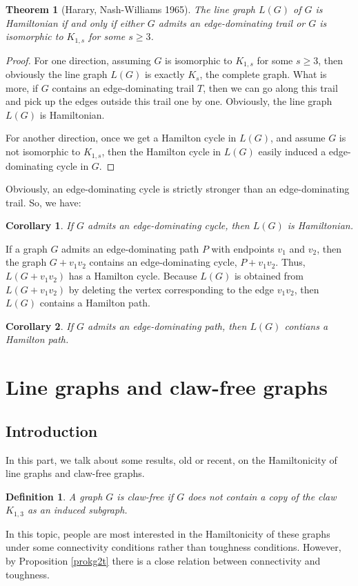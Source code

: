 \documentclass[12pt]{report}
\newtheorem{theorem}{Theorem}
\newtheorem{definition}{Definition}
\newtheorem{corollary}{Corollary}
\begin{document}
\begin{theorem}[Harary, Nash-Williams 1965]\label{edmtraitohalig}
The line graph $L(G)$ of $G$ is Hamiltonian if and only if either $G$ admits an edge-dominating trail or $G$ is isomorphic to $K_{1,s}$ for some $s\ge3$.
\end{theorem}


\begin{proof}

For one direction, assuming $G$ is isomorphic to $K_{1,s}$ for some $s\ge3$, then obviously the line graph $L(G)$ is exactly $K_s$, the complete graph. What is more, if $G$ contains an edge-dominating trail $T$, then we can go along this trail and pick up the edges outside this trail one by one. Obviously, the line graph $L(G)$ is Hamiltonian.

For another direction, once we get a Hamilton cycle in $L(G)$, and assume $G$ is not isomorphic to $K_{1,s}$, then the Hamilton cycle in $L(G)$ easily induced a edge-dominating cycle in $G$.

\end{proof}
Obviously, an edge-dominating cycle is strictly stronger than an edge-dominating trail. So, we have:
\begin{corollary}\label{edmctohlg}
If $G$ admits an edge-dominating cycle, then $L(G)$ is Hamiltonian.
\end{corollary}

If a graph $G$ admits an edge-dominating path $P$ with endpoints $v_1$ and $v_2$, then the graph $G+v_1v_2$ contains an edge-dominating cycle, $P+v_1v_2$. Thus, $L(G+v_1v_2)$ has a Hamilton cycle. Because $L(G)$ is obtained from $L(G+v_1v_2)$ by deleting the vertex corresponding to the edge $v_1v_2$, then $L(G)$ contains a Hamilton path.
\begin{corollary}
If $G$ admits an edge-dominating path, then $L(G)$ contians a Hamilton path.
\end{corollary}



\section{Line graphs and claw-free graphs}\label{seclandclfg}


\subsection{Introduction}
In this part, we talk about some results, old or recent, on the Hamiltonicity of line graphs and claw-free graphs.
\begin{definition}
A graph $G$ is claw-free if $G$ does not contain a copy of the claw $K_{1,3}$ as an induced subgraph.
\end{definition}
In this topic, people are most interested in the Hamiltonicity of these graphs under some connectivity conditions rather than toughness conditions.
However, by Proposition \ref{prokg2t} there is a close relation between connectivity and toughness.
\end{document}
